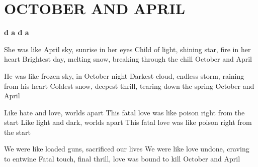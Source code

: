 \documentclass[../../../songbook.tex]{subfiles}
\begin{document}
\TabPositions{9cm} %
\section*{OCTOBER AND APRIL}
{}
\vspace{0.5cm}
{\color{red}\textbf{d  a  d  a} } \newline

She was like April sky, sunrise in her eyes			   \newline
Child of light, shining star, fire in her heart			   \newline
Brightest day, melting snow, breaking through the chill	   \newline
October and April					   \newline
    
He was like frozen sky, in October night			  \newline
Darkest cloud, endless storm, raining from his heart		  \newline
Coldest snow, deepest thrill, tearing down the spring	   \newline
October and April                                                                     \newline

\-\hspace{0.8cm} Like hate and love, worlds apart			  \newline
\-\hspace{0.8cm} This fatal love was like poison right from the start	   \newline
\-\hspace{0.8cm} Like light and dark, worlds apart			  \newline
\-\hspace{0.8cm} This fatal love was like poison right from the start	   \newline

We were like loaded guns, sacrificed our lives		\newline
We were like love undone, craving to entwine		\newline
Fatal touch, final thrill, love was bound to kill		\newline
October and April		\newline
\end{document}

